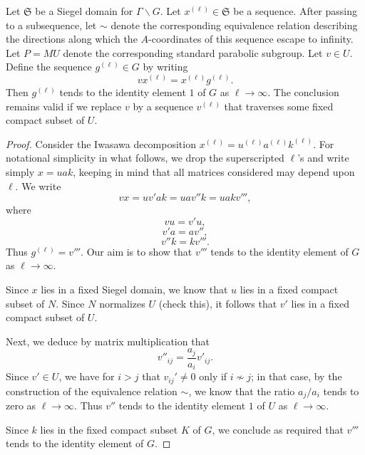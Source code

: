 \documentclass[reqno]{amsart} 
\begin{document}
\begin{lemma}\label{lem:let-mathfraks-be}
  Let $\mathfrak{S}$ be a Siegel domain for $\Gamma \backslash G$.  Let $x^{(\ell)} \in \mathfrak{S}$ be a sequence.  After passing to a subsequence, let $\sim$ denote the corresponding equivalence relation describing the directions along which the $A$-coordinates of this sequence escape to infinity.  Let $P = M U$ denote the corresponding standard parabolic subgroup.  Let $v \in U$.  Define the sequence $g^{(\ell)} \in G$ by writing
  \begin{equation*}
    v x^{(\ell)} = x^{(\ell)} g^{(\ell)}.
  \end{equation*}
  Then $g^{(\ell)}$ tends to the identity element $1$ of $G$ as $\ell \rightarrow \infty$.  The conclusion remains valid if we replace $v$ by a sequence $v^{(\ell)}$ that traverses some fixed compact subset of $U$.
\end{lemma}
\begin{proof}
  Consider the Iwasawa decomposition $x^{(\ell)} = u^{(\ell)} a^{(\ell)} k^{(\ell)}$.  For notational simplicity in what follows, we drop the superscripted ${\ell}$'s
  and write simply $x = u a k$, keeping in mind that all matrices considered may depend upon $\ell$.
  We write
  \begin{equation*}
    v x
    =
    u v' a k
    = 
    u a v'' k
    = 
    u a k v''',
  \end{equation*}
  where
  \begin{equation*}
    v u = v' u,
  \end{equation*}
  \begin{equation*}
    v' a = a v'',
  \end{equation*}
  \begin{equation*}
    v'' k = k v'''.
  \end{equation*}
  Thus $g^{(\ell)} = v'''$.  Our aim is to show that $v'''$ tends to the identity element of $G$ as $\ell \rightarrow \infty$.

  Since $x$ lies in a fixed Siegel domain, we know that $u$ lies in a fixed compact subset of $N$.  Since $N$ normalizes $U$ (check this), it follows that $v'$ lies in a fixed compact subset of $U$.

  Next, we deduce by  matrix multiplication that
  \begin{equation*}
    v''_{i j} = \frac{a_j}{a_i} v'_{i j}.
  \end{equation*}
  Since $v' \in U$, we have for $i > j$ that $v_{i j}' \neq 0$ only if $i \not \sim j$; in that case, by the construction of the equivalence relation $\sim$, we know that the ratio $a_j / a_i$ tends to zero as $\ell \rightarrow \infty$.  Thus $v''$ tends to the identity element $1$ of $U$ as $\ell \rightarrow \infty$.

  Since $k$ lies in the fixed compact subset $K$ of $G$, we conclude as required that $v'''$ tends to the identity element of $G$.
\end{proof}
\end{document}

